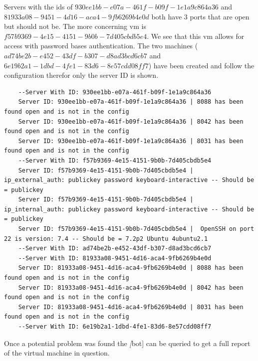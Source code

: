 \documentclass[12pt]{article}
\begin{document}
Servers with the ids of $930ee1bb-e07a-461f-b09f-1e1a9c864a36$ and $81933a08-9451-4d16-aca4-9fb6269b4e0d$ both have 3 ports that are open but should not be. The more concerning vm is $f57b9369-4e15-4151-9b0b-7d405cbdb5e4$. We see that this vm allows for access with password bases authentication. The two machines ($ad74be2b-e452-43df-b307-d8ad3bcd6cb7$ and $6e19b2a1-1dbd-4fe1-83d6-8e57cdd08ff7$) have been created and follow the configuration therefor only the server ID is shown.

\begin{mdframed}
\begin{lstlisting}
    --Server With ID: 930ee1bb-e07a-461f-b09f-1e1a9c864a36
    Server ID: 930ee1bb-e07a-461f-b09f-1e1a9c864a36 | 8088 has been found open and is not in the config
    Server ID: 930ee1bb-e07a-461f-b09f-1e1a9c864a36 | 8042 has been found open and is not in the config
    Server ID: 930ee1bb-e07a-461f-b09f-1e1a9c864a36 | 8031 has been found open and is not in the config
    --Server With ID: f57b9369-4e15-4151-9b0b-7d405cbdb5e4
    Server ID: f57b9369-4e15-4151-9b0b-7d405cbdb5e4 |  ip_external_auth: publickey password keyboard-interactive -- Should be = publickey
    Server ID: f57b9369-4e15-4151-9b0b-7d405cbdb5e4 |  ip_internal_auth: publickey password keyboard-interactive -- Should be = publickey
    Server ID: f57b9369-4e15-4151-9b0b-7d405cbdb5e4 |  OpenSSH on port 22 is version: 7.4 -- Should be = 7.2p2 Ubuntu 4ubuntu2.1
    --Server With ID: ad74be2b-e452-43df-b307-d8ad3bcd6cb7
    --Server With ID: 81933a08-9451-4d16-aca4-9fb6269b4e0d
    Server ID: 81933a08-9451-4d16-aca4-9fb6269b4e0d | 8088 has been found open and is not in the config
    Server ID: 81933a08-9451-4d16-aca4-9fb6269b4e0d | 8042 has been found open and is not in the config
    Server ID: 81933a08-9451-4d16-aca4-9fb6269b4e0d | 8031 has been found open and is not in the config
    --Server With ID: 6e19b2a1-1dbd-4fe1-83d6-8e57cdd08ff7
\end{lstlisting}
\end{mdframed}

Once a potential problem was found the \emph[bot] can be queried to get a full report of the virtual machine in question.
\end{document}
